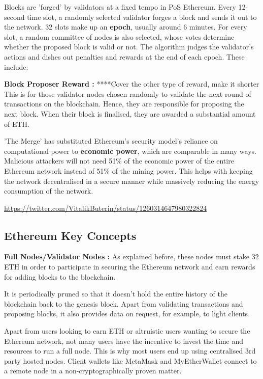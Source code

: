 Blocks are 'forged' by validators at a fixed tempo in PoS Ethereum. Every 12-second time slot, a randomly selected validator forges a block and sends it out to the network. 32 slots make up an \textbf{epoch}, usually around 6 minutes. For every slot, a random committee of nodes is also selected, whose votes determine whether the proposed block is valid or not. The algorithm judges the validator's actions and dishes out penalties and rewards at the end of each epoch. These include:

\textbf{Block Proposer Reward :}
****Cover the other type of reward, make it shorter
This is for those validator nodes chosen randomly to validate the next round of transactions on the blockchain. Hence, they are responsible for proposing the next block. When their block is finalised, they are awarded a substantial amount of ETH.


'The Merge' has substituted Ethereum's security model's reliance on computational power to \textbf{economic power}, which are comparable in many ways. Malicious attackers will not need 51\% of the economic power of the entire Ethereum network instead of 51\% of the mining power. This helps with keeping the network decentralised in a secure manner while massively reducing the energy consumption of the network. 

\url{https://twitter.com/VitalikButerin/status/1260314647980322824}



\subsection{Ethereum Key Concepts}

\textbf{Full Nodes/Validator Nodes :}
As explained before, these nodes must stake 32 ETH in order to participate in securing the Ethereum network and earn rewards for adding blocks to the blockchain.

It is periodically pruned so that it doesn't hold the entire history of the blockchain back to the genesis block. Apart from validating transactions and proposing blocks, it also provides data on request, for example, to light clients.

Apart from users looking to earn ETH or altruistic users wanting to secure the Ethereum network, not many users have the incentive to invest the time and resources to run a full node. This is why most users end up using centralised 3rd party hosted nodes. Client wallets like MetaMask and MyEtherWallet connect to a remote node in a non-cryptographically proven matter. 

